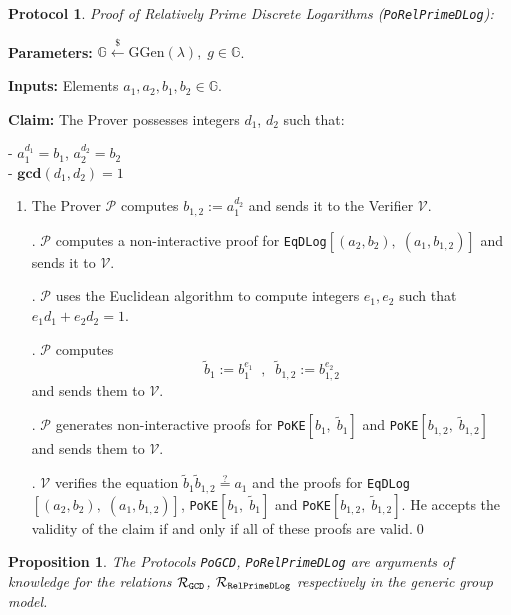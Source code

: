 \documentclass[11pt, lettersize, notitlepage, leqno, footskip=0.6cm]{article}
\newcommand{\wti}{\widetilde}
\newcommand{\mc}{\mathcal}
\newcommand{\mb}{\mathbb}
\newcommand{\mbf}{\mathbf}
\newcommand{\mr}{\mathrm}
\newcommand{\lamb}{\lambda}
\newcommand{\mP}{\mc{P}}
\newcommand{\V}{\mc{V}}
\newcommand{\vs}{\vspace{-0.15cm}}
\newcommand{\noin}{\noindent}
\newcommand{\GCD}{\mbf{gcd}}
\newtheorem{Prop}[Thm]{Proposition}
\newtheorem{Prot}[Thm]{Protocol}
\numberwithin{equation}{section}
\begin{document}
\begin{Prot} \normalfont \textit{Proof of Relatively Prime Discrete Logarithms} (\verb|PoRelPrimeDLog|):\end{Prot} \vspace{-0.3cm}

\noindent \textbf{Parameters:} $\mb{G}\xleftarrow{\$} \mr{GGen}(\lamb), \; g\in \mb{G}$.

\noindent \textbf{Inputs:} Elements $a_1, a_2, b_1, b_2 \in \mb{G}$.

\noindent \textbf{Claim:} The Prover possesses integers $d_1$, $d_2$ such that:

\noindent - $a_1^{d_1} = b_1$, $a_2^{d_2} = b_2$\\
\noindent - $\GCD(d_1, d_2) = 1$
 

\begin{enumerate}[wide, labelwidth=!, labelindent=0pt]\vs \item The Prover $\mc{P}$ computes $b_{1,2}:= a_1^{d_2}$ and sends it to the Verifier $\V$. 

. $\mP$ computes a non-interactive proof for \verb|EqDLog|$[(a_2, b_2),\; (a_1, b_{1,2})]$ and sends it to $\mc{V}$.

. $\mc{P}$ uses the Euclidean algorithm to compute integers $e_1, e_2$ such that $e_1d_1 + e_2d_2 = 1$.

\noin 4. $\mc{P}$ computes \vs $$\wti{b}_1:= b_1^{e_1}\;\;,\;\; \wti{b}_{1,2}:= b_{1,2}^{e_2} $$ and sends them to $\V$. 

\noin 5. $\mP$ generates non-interactive proofs for \verb|PoKE|$[b_1,\; \wti{b}_1]$ and \verb|PoKE|$[b_{1,2},\; \wti{b}_{1,2}]$ and sends them to $\mc{V}$.

. $\mc{V}$ verifies the equation $\wti{b}_1\wti{b}_{1,2}\stackrel{?}{=} a_1$ and the proofs for \verb|EqDLog|$[(a_2, b_2),\; (a_1, b_{1,2})]$, \verb|PoKE|$[b_1,\; \wti{b}_1]$ and \verb|PoKE|$[b_{1,2},\; \wti{b}_{1,2}]$. He accepts the validity of the claim if and only if all of these proofs are valid.\qed \end{enumerate}

\vspace{0.2cm}

\begin{Prop} The Protocols \verb|PoGCD|, \verb|PoRelPrimeDLog| are arguments of knowledge for the relations $\mc{R}_{{\tt{GCD}}}$, $\mc{R}_{{\tt{RelPrimeDLog}}}$ respectively in the generic group model.\end{Prop}
\end{document}

